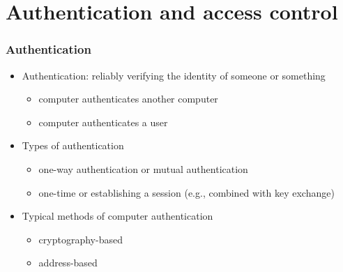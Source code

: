 \documentclass[final]{article}
\begin{document}
\section{Authentication and access control}
\subsubsection*{Authentication}
\begin{itemize}[nosep]
    \item Authentication: reliably verifying the identity of someone or something
          \begin{itemize}[nosep]
              \item computer authenticates another computer
              \item computer authenticates a user
          \end{itemize}
    \item Types of authentication
          \begin{itemize}[nosep]
              \item one-way authentication or mutual authentication
              \item one-time or establishing a session (e.g., combined with key exchange)
          \end{itemize}
    \item Typical methods of computer authentication
          \begin{itemize}[nosep]
              \item cryptography-based
              \item address-based
          \end{itemize}
\end{itemize}
\end{document}
